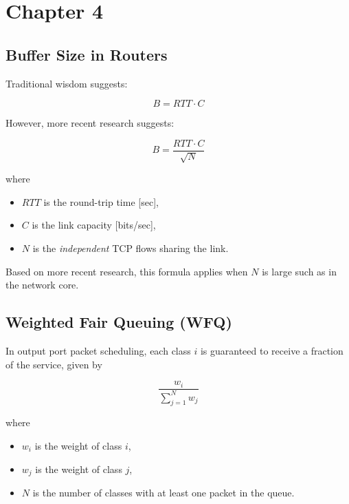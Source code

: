 \section{Chapter 4}

\subsection{Buffer Size in Routers}

Traditional wisdom suggests:

\begin{equation*}
    B = RTT \cdot C
\end{equation*}

However, more recent research suggests:

\begin{equation*}
    B = \frac{RTT \cdot C}{\sqrt N}
\end{equation*}

where
\begin{itemize}
    \item $RTT$ is the round-trip time [sec],
    \item $C$ is the link capacity [bits/sec],
    \item $N$ is the \emph{independent} TCP flows sharing the link.
\end{itemize}

Based on more recent research, this formula applies when $N$ is large such as in the network core.

\subsection{Weighted Fair Queuing (WFQ)}

In output port packet scheduling, each class $i$ is guaranteed to receive a fraction of the service, given by

\begin{equation*}
    \frac{w_i}{\sum_{j=1}^N w_j}
\end{equation*}

where
\begin{itemize}
    \item $w_i$ is the weight of class $i$,
    \item $w_j$ is the weight of class $j$,
    \item $N$ is the number of classes with at least one packet in the queue.
\end{itemize}